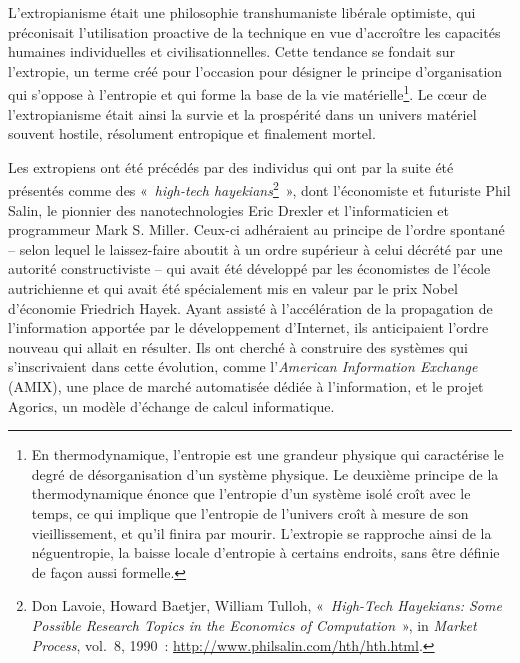 \documentclass[
  a5paper,
  smalldemyvopaper,10pt,twoside,onecolumn,openright,extrafontsizes,hidelinks]{memoir}
\begin{document}
L'extropianisme était une philosophie transhumaniste libérale optimiste,
qui préconisait l'utilisation proactive de la technique en vue
d'accroître les capacités humaines individuelles et civilisationnelles.
Cette tendance se fondait sur l'extropie, un terme créé pour l'occasion
pour désigner le principe d'organisation qui s'oppose à l'entropie et
qui forme la base de la vie matérielle\footnote{En thermodynamique,
  l'entropie est une grandeur physique qui caractérise le degré de
  désorganisation d'un système physique. Le deuxième principe de la
  thermodynamique énonce que l'entropie d'un système isolé croît avec le
  temps, ce qui implique que l'entropie de l'univers croît à mesure de
  son vieillissement, et qu'il finira par mourir. L'extropie se
  rapproche ainsi de la néguentropie, la baisse locale d'entropie à
  certains endroits, sans être définie de façon aussi formelle.}. Le
cœur de l'extropianisme était ainsi la survie et la prospérité dans un
univers matériel souvent hostile, résolument entropique et finalement
mortel.

Les extropiens ont été précédés par des individus qui ont par la suite
été présentés comme des «~\emph{high-tech hayekians}\footnote{Don
  Lavoie, Howard Baetjer, William Tulloh, «~\emph{High-Tech Hayekians:
  Some Possible Research Topics in the Economics of Computation}~», in
  \emph{Market Process}, vol.~8, 1990~:
  \url{http://www.philsalin.com/hth/hth.html}.}~», dont l'économiste et
futuriste Phil Salin, le pionnier des nanotechnologies Eric Drexler et
l'informaticien et programmeur Mark S. Miller. Ceux-ci adhéraient au
principe de l'ordre spontané -- selon lequel le laissez-faire aboutit à
un ordre supérieur à celui décrété par une autorité constructiviste --
qui avait été développé par les économistes de l'école autrichienne et
qui avait été spécialement mis en valeur par le prix Nobel d'économie
Friedrich Hayek. Ayant assisté à l'accélération de la propagation de
l'information apportée par le développement d'Internet, ils anticipaient
l'ordre nouveau qui allait en résulter. Ils ont cherché à construire des
systèmes qui s'inscrivaient dans cette évolution, comme l'\emph{American
Information Exchange} (AMIX), une place de marché automatisée dédiée à
l'information, et le projet Agorics, un modèle d'échange de calcul
informatique.
\end{document}
